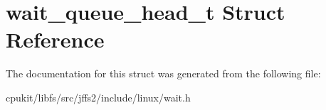 \hypertarget{structwait__queue__head__t}{}\section{wait\+\_\+queue\+\_\+head\+\_\+t Struct Reference}
\label{structwait__queue__head__t}


The documentation for this struct was generated from the following file\+:\begin{DoxyCompactItemize}
\item 
cpukit/libfs/src/jffs2/include/linux/wait.\+h\end{DoxyCompactItemize}
